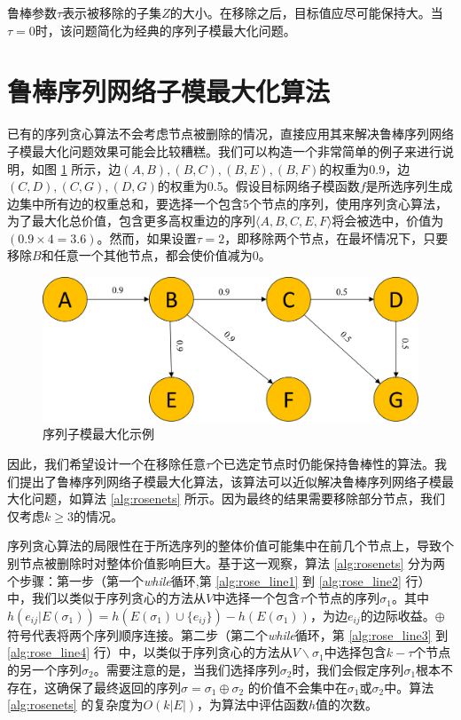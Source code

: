 鲁棒参数\(\tau\)表示被移除的子集\(Z\)的大小。在移除之后，目标值应尽可能保持大。当\(\tau = 0\)时，该问题简化为经典的序列子模最大化问题\cite{mitrovic2018submodularity}。

\section{鲁棒序列网络子模最大化算法}
\label{sec:3_2}

已有的序列贪心算法\cite{mitrovic2018submodularity}不会考虑节点被删除的情况，直接应用其来解决鲁棒序列网络子模最大化问题效果可能会比较糟糕。我们可以构造一个非常简单的例子来进行说明，如图 \ref{fig:rose_sample} 所示，边$(A,B),(B,C),(B,E),(B,F)$的权重为0.9，边$(C,D),(C,G),(D,G)$的权重为0.5。假设目标网络子模函数\(f\)是所选序列生成边集中所有边的权重总和，要选择一个包含5个节点的序列，使用序列贪心算法，为了最大化总价值，包含更多高权重边的序列\(\langle A,B,C,E,F \rangle\)将会被选中，价值为\((0.9 \times 4 = 3.6)\)。然而，如果设置\(\tau=2\)，即移除两个节点，在最坏情况下，只要移除\(B\)和任意一个其他节点，都会使价值减为$0$。

\begin{figure}[th]
    \centering
    \includegraphics[width=.89\linewidth]{figure/rosenets/sample2}
    \caption{序列子模最大化示例}
    \label{fig:rose_sample}
\end{figure}

因此，我们希望设计一个在移除任意$\tau$个已选定节点时仍能保持鲁棒性的算法。我们提出了鲁棒序列网络子模最大化算法，该算法可以近似解决鲁棒序列网络子模最大化问题，如算法 \ref{alg:rosenets} 所示。因为最终的结果需要移除部分节点，我们仅考虑$k \ge 3$的情况。

序列贪心算法的局限性在于所选序列的整体价值可能集中在前几个节点上，导致个别节点被删除时对整体价值影响巨大。基于这一观察，算法 \ref{alg:rosenets} 分为两个步骤：第一步（第一个\textit{while}循环,第 \ref{alg:rose_line1} 到 \ref{alg:rose_line2} 行）中，我们以类似于序列贪心的方法从\(V\)中选择一个包含\(\tau\)个节点的序列\(\sigma_1\)。其中$h(e_{ij}|E(\sigma_1))=h(E(\sigma_1)\cup\{e_{ij}\})-h(E(\sigma_1))$，为边$e_{ij}$的边际收益。$\oplus$符号代表将两个序列顺序连接。第二步（第二个\textit{while}循环，第 \ref{alg:rose_line3} 到 \ref{alg:rose_line4} 行）中，以类似于序列贪心的方法从\(V\backslash \sigma_1\)中选择包含\(k-\tau\)个节点的另一个序列\(\sigma_2\)。需要注意的是，当我们选择序列\(\sigma_2\)时，我们会假定序列\(\sigma_1\)根本不存在，这确保了最终返回的序列\(\sigma = \sigma_1 \oplus \sigma_2\) 的价值不会集中在\(\sigma_1\)或\(\sigma_2\)中。算法 \ref{alg:rosenets} 的复杂度为\(O(k|E|)\)，为算法中评估函数$h$值的次数。

